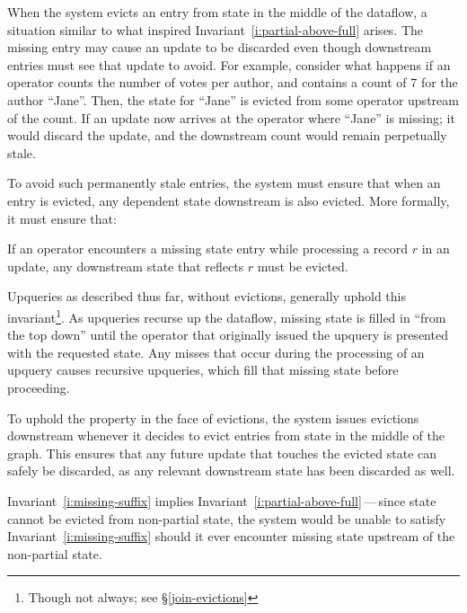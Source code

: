 When the system evicts an entry from state in the middle of the dataflow, a
situation similar to what inspired Invariant~\ref{i:partial-above-full} arises.
The missing entry may cause an update to be discarded even though downstream
entries must see that update to avoid. For example, consider what happens if an
operator counts the number of votes per author, and contains a count
of 7 for the author ``Jane''. Then, the state for ``Jane'' is evicted from some
operator upstream of the count. If an update now arrives at the operator where
``Jane'' is missing; it would discard the update, and the downstream count would
remain perpetually stale.

To avoid such permanently stale entries, the system must ensure that when an
entry is evicted, any dependent state downstream is also evicted. More formally,
it must ensure that:

\begin{invariant}
  \label{i:missing-suffix}
  If an operator encounters a missing state entry while processing a record $r$
  in an update, any downstream state that reflects $r$ must be evicted.
\end{invariant}

Upqueries as described thus far, without evictions, generally uphold this
invariant\footnote{Though not always; see \S\ref{join-evictions}}. As upqueries
recurse up the dataflow, missing state is filled in ``from the top down'' until
the operator that originally issued the upquery is presented with the requested
state. Any misses that occur during the processing of an upquery causes
recursive upqueries, which fill that missing state before proceeding.

To uphold the property in the face of evictions, the system issues evictions
downstream whenever it decides to evict entries from state in the middle of the
graph. This ensures that any future update that touches the evicted state can
safely be discarded, as any relevant downstream state has been discarded as
well.

Invariant~\ref{i:missing-suffix} implies
Invariant~\ref{i:partial-above-full}\,---\,since state cannot be evicted from
non-partial state, the system would be unable to satisfy
Invariant~\ref{i:missing-suffix} should it ever encounter missing state upstream
of the non-partial state.
